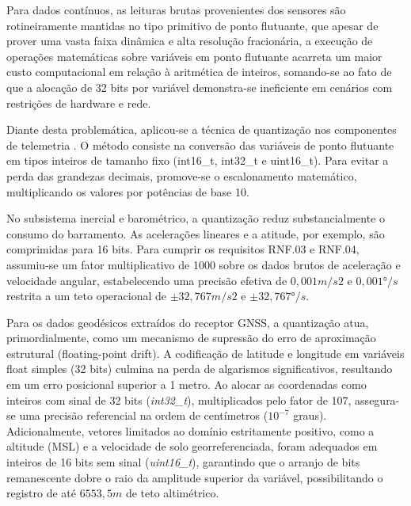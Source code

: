 Para dados contínuos, as leituras brutas provenientes dos sensores são rotineiramente mantidas no tipo primitivo de ponto flutuante, que apesar de prover uma vasta faixa dinâmica e alta resolução fracionária, a execução de operações matemáticas sobre variáveis em ponto flutuante acarreta um maior custo computacional em relação à aritmética de inteiros, somando-se ao fato de que a alocação de 32 bits por variável demonstra-se ineficiente em cenários com restrições de hardware e rede.

Diante desta problemática, aplicou-se a técnica de quantização nos componentes de telemetria \cite{quantization}. O método consiste na conversão das variáveis de ponto flutuante em tipos inteiros de tamanho fixo (int16\_t, int32\_t e uint16\_t). Para evitar a perda das grandezas decimais, promove-se o escalonamento matemático, multiplicando os valores por potências de base 10.

No subsistema inercial e barométrico, a quantização reduz substancialmente o consumo do barramento. As acelerações lineares e a atitude, por exemplo, são comprimidas para 16 bits. Para cumprir os requisitos RNF.03 e RNF.04, assumiu-se um fator multiplicativo de 1000 sobre os dados brutos de aceleração e velocidade angular, estabelecendo uma precisão efetiva de $0,001m/s2$ e $0,001°/s$ restrita a um teto operacional de $±32,767m/s2$ e $±32,767°/s$. 

Para os dados geodésicos extraídos do receptor GNSS, a quantização atua, primordialmente, como um mecanismo de supressão do erro de aproximação estrutural (floating-point drift). A codificação de latitude e longitude em variáveis float simples (32 bits) culmina na perda de algarismos significativos, resultando em um erro posicional superior a 1 metro. Ao alocar as coordenadas como inteiros com sinal de 32 bits (\textit{int32\_t}), multiplicados pelo fator de 107, assegura-se uma precisão referencial na ordem de centímetros ($10^{-7}$ graus). Adicionalmente, vetores limitados ao domínio estritamente positivo, como a altitude (MSL) e a velocidade de solo georreferenciada, foram adequados em inteiros de 16 bits sem sinal (\textit{uint16\_t}), garantindo que o arranjo de bits remanescente dobre o raio da amplitude superior da variável, possibilitando o registro de até $6553,5m$ de teto altimétrico.

